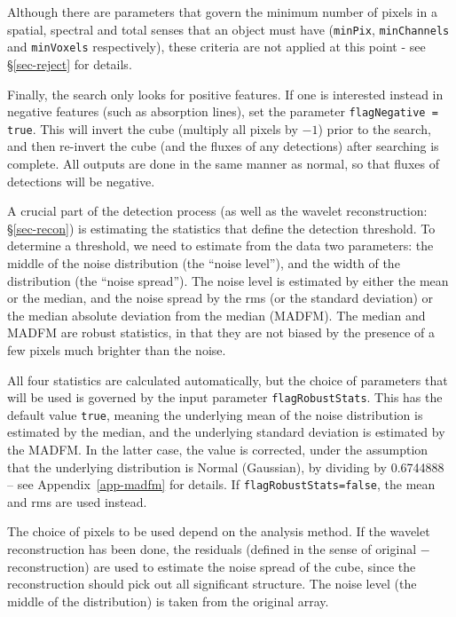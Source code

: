 Although there are parameters that govern the minimum number of pixels
in a spatial, spectral and total senses that an object must have
(\texttt{minPix}, \texttt{minChannels} and \texttt{minVoxels}
respectively), these criteria are not applied at this point - see
\S\ref{sec-reject} for details.

Finally, the search only looks for positive features. If one is
interested instead in negative features (such as absorption lines),
set the parameter \texttt{flagNegative = true}. This will invert the
cube (\ie multiply all pixels by $-1$) prior to the search, and then
re-invert the cube (and the fluxes of any detections) after searching
is complete. All outputs are done in the same manner as normal, so
that fluxes of detections will be negative.

\label{sec-stats}

A crucial part of the detection process (as well as the wavelet
reconstruction: \S\ref{sec-recon}) is estimating the statistics that
define the detection threshold. To determine a threshold, we need to
estimate from the data two parameters: the middle of the noise
distribution (the ``noise level''), and the width of the distribution
(the ``noise spread''). The noise level is estimated by either the
mean or the median, and the noise spread by the rms (or the standard
deviation) or the median absolute deviation from the median
(MADFM). The median and MADFM are robust statistics, in that they are
not biased by the presence of a few pixels much brighter than the
noise.

All four statistics are calculated automatically, but the choice of
parameters that will be used is governed by the input parameter
\texttt{flagRobustStats}. This has the default value \texttt{true},
meaning the underlying mean of the noise distribution is estimated by
the median, and the underlying standard deviation is estimated by the
MADFM. In the latter case, the value is corrected, under the
assumption that the underlying distribution is Normal (Gaussian), by
dividing by 0.6744888 -- see Appendix~\ref{app-madfm} for details. If
\texttt{flagRobustStats=false}, the mean and rms are used instead.

The choice of pixels to be used depend on the analysis method. If the
wavelet reconstruction has been done, the residuals (defined
in the sense of original $-$ reconstruction) are used to estimate the
noise spread of the cube, since the reconstruction should pick out
all significant structure. The noise level (the middle of the
distribution) is taken from the original array.

